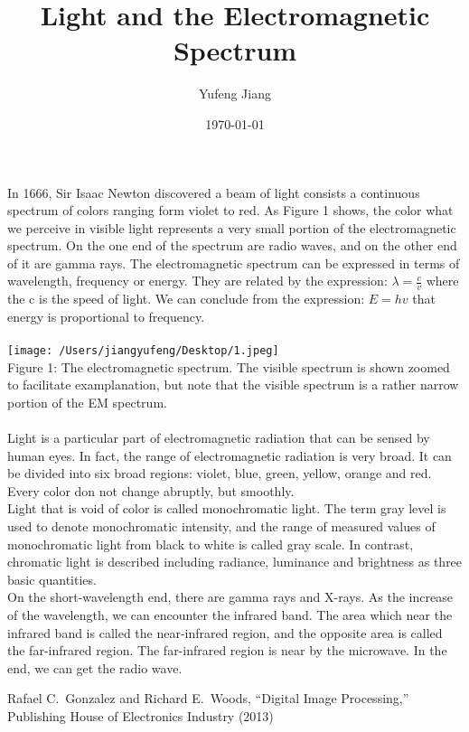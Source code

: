 \documentclass[11pt,oneside]{article}
\title{Light and the Electromagnetic Spectrum}
\author{Yufeng Jiang}
\date{\today}
\begin{document}
\maketitle
In 1666, Sir Isaac Newton discovered a beam of light consists a continuous spectrum of colors ranging form violet to red. As Figure 1 shows, the color what we perceive in visible light represents a very small portion of the electromagnetic spectrum. On the one end of the spectrum are radio waves, and on the other end of it are gamma rays. The electromagnetic spectrum can be expressed in terms of wavelength, frequency or energy. They are related by the expression: 
$ \lambda=\frac{c}{v} $ where the c is the speed of light. We can conclude from the expression:
$E=hv$ that energy is proportional to frequency.\\
 \\
\texttt{[image: /Users/jiangyufeng/Desktop/1.jpeg]}\\
Figure 1: The electromagnetic spectrum. The visible spectrum is shown zoomed to facilitate examplanation, but note that the visible spectrum is a rather narrow portion of the EM spectrum.\\
\\
\indent Light is a particular part of electromagnetic radiation that can be sensed by human eyes. In fact, the range of electromagnetic radiation is very broad. It can be divided into six broad regions: violet, blue, green, yellow, orange and red. Every color don not change abruptly, but smoothly. \\
\indent Light that is void of color is called monochromatic light. The term gray level is used to denote monochromatic intensity, and the range of measured values of monochromatic light from black to white is called gray scale. In contrast, chromatic light is described including radiance, luminance and brightness as three basic quantities.\\
\indent On the short-wavelength end, there are gamma rays and X-rays. As the increase of the wavelength, we can encounter the infrared band. The area which near the infrared band is called the near-infrared region, and the opposite area is called the far-infrared region. The far-infrared region is near by the microwave. In the end, we can get the radio wave.
\begin{thebibliography}{9}
 Rafael C.~Gonzalez and Richard E.~Woods, ``Digital Image Processing,'' Publishing House of Electronics Industry (2013)
\end{thebibliography}
\end{document}
